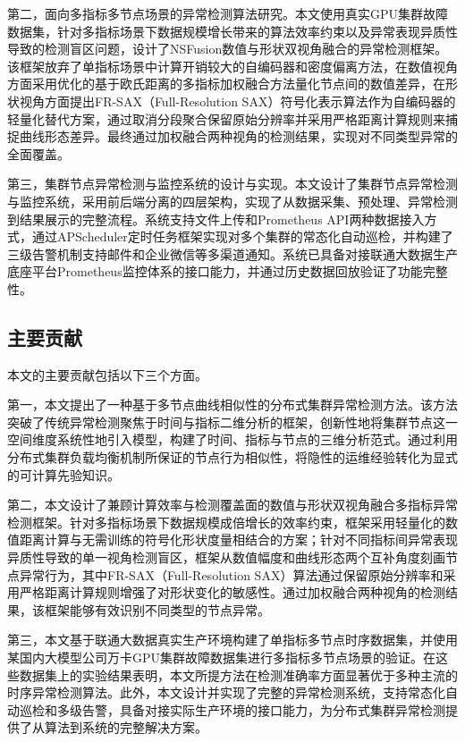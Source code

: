 第二，面向多指标多节点场景的异常检测算法研究。本文使用真实GPU集群故障数据集，针对多指标场景下数据规模增长带来的算法效率约束以及异常表现异质性导致的检测盲区问题，设计了NSFusion数值与形状双视角融合的异常检测框架。该框架放弃了单指标场景中计算开销较大的自编码器和密度偏离方法，在数值视角方面采用优化的基于欧氏距离的多指标加权融合方法量化节点间的数值差异，在形状视角方面提出FR-SAX（Full-Resolution SAX）符号化表示算法作为自编码器的轻量化替代方案，通过取消分段聚合保留原始分辨率并采用严格距离计算规则来捕捉曲线形态差异。最终通过加权融合两种视角的检测结果，实现对不同类型异常的全面覆盖。

第三，集群节点异常检测与监控系统的设计与实现。本文设计了集群节点异常检测与监控系统，采用前后端分离的四层架构，实现了从数据采集、预处理、异常检测到结果展示的完整流程。系统支持文件上传和Prometheus API两种数据接入方式，通过APScheduler定时任务框架实现对多个集群的常态化自动巡检，并构建了三级告警机制支持邮件和企业微信等多渠道通知。系统已具备对接联通大数据生产底座平台Prometheus监控体系的接口能力，并通过历史数据回放验证了功能完整性。

\subsection{主要贡献}

本文的主要贡献包括以下三个方面。

第一，本文提出了一种基于多节点曲线相似性的分布式集群异常检测方法。该方法突破了传统异常检测聚焦于时间与指标二维分析的框架，创新性地将集群节点这一空间维度系统性地引入模型，构建了时间、指标与节点的三维分析范式。通过利用分布式集群负载均衡机制所保证的节点行为相似性，将隐性的运维经验转化为显式的可计算先验知识。

第二，本文设计了兼顾计算效率与检测覆盖面的数值与形状双视角融合多指标异常检测框架。针对多指标场景下数据规模成倍增长的效率约束，框架采用轻量化的数值距离计算与无需训练的符号化形状度量相结合的方案；针对不同指标间异常表现异质性导致的单一视角检测盲区，框架从数值幅度和曲线形态两个互补角度刻画节点异常行为，其中FR-SAX（Full-Resolution SAX）算法通过保留原始分辨率和采用严格距离计算规则增强了对形状变化的敏感性。通过加权融合两种视角的检测结果，该框架能够有效识别不同类型的节点异常。

第三，本文基于联通大数据真实生产环境构建了单指标多节点时序数据集，并使用某国内大模型公司万卡GPU集群故障数据集进行多指标多节点场景的验证。在这些数据集上的实验结果表明，本文所提方法在检测准确率方面显著优于多种主流的时序异常检测算法。此外，本文设计并实现了完整的异常检测系统，支持常态化自动巡检和多级告警，具备对接实际生产环境的接口能力，为分布式集群异常检测提供了从算法到系统的完整解决方案。

